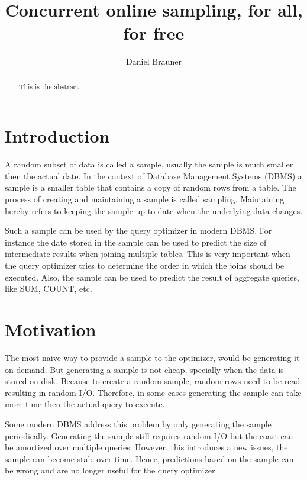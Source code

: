 \documentclass[acmlarge,nonacm]{acmart}
\begin{document}
    \title{Concurrent online sampling, for all, for free}

    \author{Daniel Brauner}
    
    \begin{abstract}
        This is the abstract.
    \end{abstract}


    \maketitle

    \section{Introduction}
        A random subset of data is called a sample, usually the sample is much smaller then the actual date. In the context of Database Management Systems (DBMS) a sample is a smaller table that contains a copy of random rows from a table. The process of creating and maintaining a sample is called sampling. Maintaining hereby refers to keeping the sample up to date when the underlying data changes.
    
        Such a sample can be used by the query optimizer in modern DBMS. For instance the date stored in the sample can be used to predict the size of intermediate results when joining multiple tables. This is very important when the query optimizer tries to determine the order in which the joins should be executed. Also, the sample can be used to predict the result of aggregate queries, like SUM, COUNT, etc. 



    \section{Motivation} 
        The most naive way to provide a sample to the optimizer, would be generating it on demand. But generating a sample is not cheap, specially when the data is stored on disk. Because to create a random sample, random rows need to be read resulting in random I/O. Therefore, in some cases generating the sample can take more time then the actual query to execute.

        Some modern DBMS address this problem by only generating the sample periodically. Generating the sample still requires random I/O but the coast can be amortized over multiple queries. However, this introduces a new issues, the sample can become stale over time. Hence, predictions based on the sample can be wrong and are no longer useful for the query optimizer.
\end{document}
